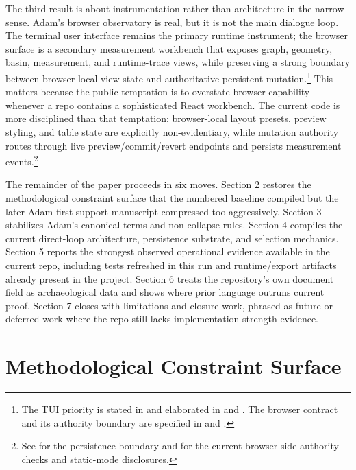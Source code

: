 \documentclass[10pt]{article}
\begin{document}
The third result is about instrumentation rather than architecture in the narrow sense. Adam's browser observatory is real, but it is not the main dialogue loop. The terminal user interface remains the primary runtime instrument; the browser surface is a secondary measurement workbench that exposes graph, geometry, basin, measurement, and runtime-trace views, while preserving a strong boundary between browser-local view state and authoritative persistent mutation.\footnote{The TUI priority is stated in  and elaborated in  and . The browser contract and its authority boundary are specified in  and .} This matters because the public temptation is to overstate browser capability whenever a repo contains a sophisticated React workbench. The current code is more disciplined than that temptation: browser-local layout presets, preview styling, and table state are explicitly non-evidentiary, while mutation authority routes through live preview/commit/revert endpoints and persists measurement events.\footnote{See  for the persistence boundary and  for the current browser-side authority checks and static-mode disclosures.}

The remainder of the paper proceeds in six moves. Section 2 restores the methodological constraint surface that the numbered baseline compiled but the later Adam-first support manuscript compressed too aggressively. Section 3 stabilizes Adam's canonical terms and non-collapse rules. Section 4 compiles the current direct-loop architecture, persistence substrate, and selection mechanics. Section 5 reports the strongest observed operational evidence available in the current repo, including tests refreshed in this run and runtime/export artifacts already present in the project. Section 6 treats the repository's own document field as archaeological data and shows where prior language outruns current proof. Section 7 closes with limitations and closure work, phrased as future or deferred work where the repo still lacks implementation-strength evidence.

\section{Methodological Constraint Surface}
\end{document}
